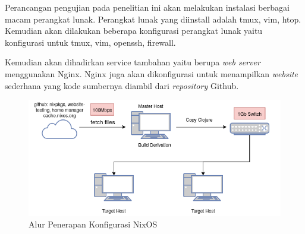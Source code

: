 \documentclass[10pt,twoside]{report}
\begin{document}
\begin{adjustwidth}{20pt}{}
	\hspace\parindent
	Perancangan pengujian pada penelitian ini akan melakukan instalasi berbagai
	macam perangkat lunak. Perangkat lunak yang diinstall adalah tmux, vim,
	htop. Kemudian akan dilakukan beberapa konfigurasi perangkat lunak
	yaitu konfigurasi untuk tmux, vim, openssh, firewall.

	Kemudian akan dihadirkan service tambahan yaitu berupa \textit{web server}
	menggunakan Nginx. Nginx juga akan dikonfigurasi untuk menampilkan
	\textit{website} sederhana yang kode sumbernya diambil dari
	\textit{repository} Github.
	\begin{figure}[H]
		\centering
		\includegraphics[width=\textwidth]{images/nixos-topology-revision.png}
		\caption{Alur Penerapan Konfigurasi NixOS}
	\end{figure}


\end{adjustwidth}
\end{document}
